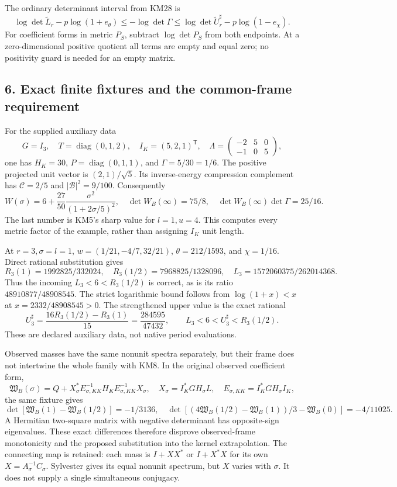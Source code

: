\documentclass[11pt]{article}
\begin{document}
The ordinary determinant interval from KM28 is \[
 \log\det\widetilde L_r-p\log(1+e_\theta)
 \le-\log\det\Gamma\le
 \log\det\widetilde U_r^\sharp-p\log(1-e_\chi).
 \tag{KM29}
\] For coefficient forms in metric \(P_S\), subtract \(\log\det P_S\) from both endpoints. At a zero-dimensional positive quotient all terms are empty and equal zero; no positivity guard is needed for an empty matrix.

\subsection{6. Exact finite fixtures and the common-frame requirement}\label{exact-finite-fixtures-and-the-common-frame-requirement}

For the supplied auxiliary data \[
 G=I_3,\quad T=\operatorname{diag}(0,1,2),\quad
 I_K=(5,2,1)^{\mathsf T},\quad
 \Lambda=\begin{pmatrix}-2&5&0\\-1&0&5\end{pmatrix},
\] one has \(H_K=30\), \(P=\operatorname{diag}(0,1,1)\), and \(\Gamma=5/30=1/6\). The positive projected unit vector is \((2,1)/\sqrt5\). Its inverse-energy compression complement has \(\mathcal C=2/5\) and \(|\mathcal B|^2=9/100\). Consequently \[
 W(\sigma)=6+\frac{27}{50}\frac{\sigma^2}{(1+2\sigma/5)^2},
 \quad \det W_B(\infty)=75/8,\quad
 \det W_B(\infty)\det\Gamma=25/16.
 \tag{KM30}
\] The last number is KM5's sharp value for \(l=1,u=4\). This computes every metric factor of the example, rather than assigning \(I_K\) unit length.

At \(r=3,\sigma=l=1\), \(w=(1/21,-4/7,32/21)\), \(\theta=212/1593\), and \(\chi=1/16\). Direct rational substitution gives \[
 R_3(1)=1992825/332024,\quad R_3(1/2)=7968825/1328096,
 \quad L_3=1572060375/262014368.
 \tag{KM31}
\] Thus the incoming \(L_3<6<R_3(1/2)\) is correct, as is its ratio \(48910877/48908545\). The strict logarithmic bound follows from \(\log(1+x)<x\) at \(x=2332/48908545>0\). The strengthened upper value is the exact rational \[
 U_3^\sharp=\frac{16R_3(1/2)-R_3(1)}{15}
 =\frac{284595}{47432},
 \qquad L_3<6<U_3^\sharp<R_3(1/2).
 \tag{KM32}
\] These are declared auxiliary data, not native period evaluations.

Observed masses have the same nonunit spectra separately, but their frame does not intertwine the whole family with KM8. In the original observed coefficient form, \[
 \mathfrak W_B(\sigma)
 =Q+X_\sigma^*E_{\sigma,KK}^{-1}H_KE_{\sigma,KK}^{-1}X_\sigma,
 \quad X_\sigma=I_K^*GH_\sigma L,\quad
 E_{\sigma,KK}=I_K^*GH_\sigma I_K,
\] the same fixture gives \[
 \det[\mathfrak W_B(1)-\mathfrak W_B(1/2)]=-1/3136,\quad
 \det[(4\mathfrak W_B(1/2)-\mathfrak W_B(1))/3
       -\mathfrak W_B(0)]=-4/11025.
 \tag{KM33}
\] A Hermitian two-square matrix with negative determinant has opposite-sign eigenvalues. These exact differences therefore disprove observed-frame monotonicity and the proposed substitution into the kernel extrapolation. The connecting map is retained: each mass is \(I+XX^*\) or \(I+X^*X\) for its own \(X=A_\sigma^{-1}C_\sigma\). Sylvester gives its equal nonunit spectrum, but \(X\) varies with \(\sigma\). It does not supply a single simultaneous conjugacy.
\end{document}
